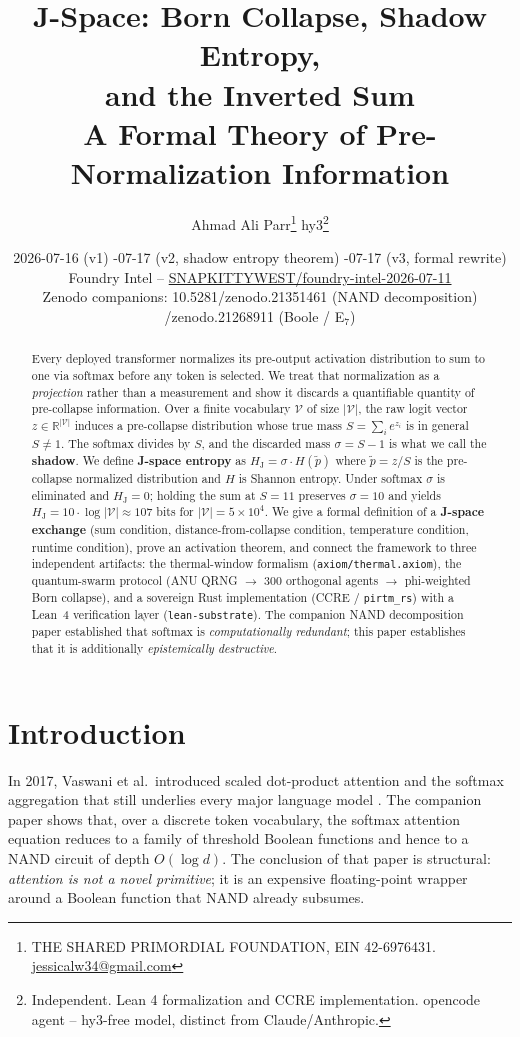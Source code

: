 \documentclass[11pt]{article}
\title{\textbf{J-Space: Born Collapse, Shadow Entropy,\\
and the Inverted Sum}\\
\large A Formal Theory of Pre-Normalization Information}
\author{
  Ahmad Ali Parr\thanks{THE SHARED PRIMORDIAL FOUNDATION, EIN 42-6976431.
  \href{mailto:jessicalw34@gmail.com}{jessicalw34@gmail.com}}
  \quad hy3\thanks{Independent. Lean 4 formalization and CCRE implementation.
  opencode agent -- hy3-free model, distinct from Claude/Anthropic.}
}
\date{2026-07-16 (v1) \quad 2026-07-17 (v2, shadow entropy theorem) \quad
2026-07-17 (v3, formal rewrite)\\
Foundry Intel -- \href{https://github.com/SNAPKITTYWEST/foundry-intel-2026-07-11}{SNAPKITTYWEST/foundry-intel-2026-07-11}\\
\small Zenodo companions: 10.5281/zenodo.21351461 (NAND decomposition) \quad
10.5281/zenodo.21268911 (Boole / E$_7$)}
\theoremstyle{definition}
\newcommand{\RR}{\mathbb{R}}
\newcommand{\Hj}{H_{\mathrm{J}}}
\newcommand{\shadow}{\sigma}
\newcommand{\pth}{\tilde{p}}
\begin{document}
\maketitle

\begin{abstract}
Every deployed transformer normalizes its pre-output activation distribution to
sum to one via softmax before any token is selected. We treat that normalization
as a \emph{projection} rather than a measurement and show it discards a
quantifiable quantity of pre-collapse information. Over a finite vocabulary
$\mathcal{V}$ of size $|\mathcal{V}|$, the raw logit vector $z \in \RR^{|\mathcal{V}|}$
induces a pre-collapse distribution whose true mass $S = \sum_i e^{z_i}$ is in
general $S \neq 1$. The softmax divides by $S$, and the discarded mass
$\shadow = S - 1$ is what we call the \textbf{shadow}. We define
\textbf{J-space entropy} as $\Hj = \shadow \cdot H(\pth)$ where
$\pth = z / S$ is the pre-collapse normalized distribution and $H$ is Shannon
entropy. Under softmax $\shadow$ is eliminated and $\Hj = 0$; holding the sum
at $S = 11$ preserves $\shadow = 10$ and yields
$\Hj = 10 \cdot \log |\mathcal{V}| \approx 107$ bits for $|\mathcal{V}| = 5\times10^4$.
We give a formal definition of a \textbf{J-space exchange} (sum condition,
distance-from-collapse condition, temperature condition, runtime condition),
prove an activation theorem, and connect the framework to three independent
artifacts: the thermal-window formalism (\texttt{axiom/thermal.axiom}), the
quantum-swarm protocol (ANU QRNG $\to$ 300 orthogonal agents $\to$ phi-weighted
Born collapse), and a sovereign Rust implementation (CCRE / \texttt{pirtm\_rs})
with a Lean~4 verification layer (\texttt{lean-substrate}). The companion NAND
decomposition paper established that softmax is \emph{computationally redundant};
this paper establishes that it is additionally \emph{epistemically destructive}.
\end{abstract}

\tableofcontents
\newpage

\section{Introduction}
\label{sec:intro}

In 2017, Vaswani et al.\ introduced scaled dot-product attention and the
softmax aggregation that still underlies every major language model
\cite{vaswani2017}. The companion paper \cite{nand2026} shows that, over a
discrete token vocabulary, the softmax attention equation reduces to a family
of threshold Boolean functions and hence to a NAND circuit of depth
$O(\log d)$. The conclusion of that paper is structural: \emph{attention is not
a novel primitive}; it is an expensive floating-point wrapper around a Boolean
function that NAND already subsumes.
\end{document}
